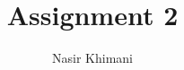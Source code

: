 \documentclass{article}%
\begin{document}
\title{Assignment 2}
\author{Nasir Khimani}
\maketitle

\clearpage
\end{document}

